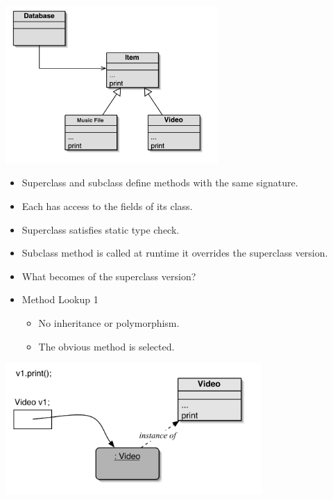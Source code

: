 \documentclass{beamer}
\begin{document}
\begin{frame}
\begin{center}
\includegraphics[height=6cm, keepaspectratio]{images/poly3}
\end{center}
\end{frame}

\begin{frame}
\begin{itemize}
\item Superclass and subclass define methods with the same signature.
\item Each has access to the fields of its class.
\item Superclass satisfies static type check.
\item Subclass method is called at runtime it overrides the superclass version.
\item What becomes of the superclass version?
\end{itemize}
\end{frame}

\begin{frame}
\begin{itemize}
\item Method Lookup 1
\begin{itemize}
\item No inheritance or polymorphism.
\item The obvious method is selected.
\end{itemize}
\end{itemize}
\begin{center}
\includegraphics[height=5cm, keepaspectratio]{images/poly4}
\end{center}
\end{frame}
\end{document}
